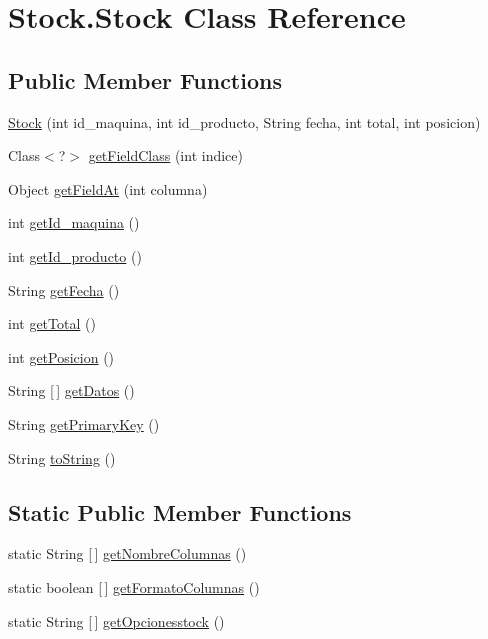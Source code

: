 \hypertarget{class_stock_1_1_stock}{}\section{Stock.\+Stock Class Reference}
\label{class_stock_1_1_stock}
\subsection*{Public Member Functions}
\begin{DoxyCompactItemize}
\item 
\mbox{\hyperlink{class_stock_1_1_stock_a748d53e5ea491907d038c18cb30520c7}{Stock}} (int id\+\_\+maquina, int id\+\_\+producto, String fecha, int total, int posicion)
\item 
Class$<$?$>$ \mbox{\hyperlink{class_stock_1_1_stock_a8e00c1574f810330efb7c84ff971be09}{get\+Field\+Class}} (int indice)
\item 
Object \mbox{\hyperlink{class_stock_1_1_stock_a7fbba145dd4040cc394bb0d903e43787}{get\+Field\+At}} (int columna)
\item 
int \mbox{\hyperlink{class_stock_1_1_stock_acecc43ec5fb13d91e02be7394af1130b}{get\+Id\+\_\+maquina}} ()
\item 
int \mbox{\hyperlink{class_stock_1_1_stock_aa5fac816e624d7e89c4f9f9d081251dc}{get\+Id\+\_\+producto}} ()
\item 
String \mbox{\hyperlink{class_stock_1_1_stock_a4f9b096fbfa184bb56e35fe5b2dd2cac}{get\+Fecha}} ()
\item 
int \mbox{\hyperlink{class_stock_1_1_stock_ad8b5a5604a4421296ab62e8e54817fdd}{get\+Total}} ()
\item 
int \mbox{\hyperlink{class_stock_1_1_stock_aaf8aeb342fb5a0fc05f80a23d03dd5e4}{get\+Posicion}} ()
\item 
String \mbox{[}$\,$\mbox{]} \mbox{\hyperlink{class_stock_1_1_stock_a493235850d940467075d86d233c4c381}{get\+Datos}} ()
\item 
String \mbox{\hyperlink{class_stock_1_1_stock_aaba40908c8c5d06d27e39c3f0c57ba07}{get\+Primary\+Key}} ()
\item 
String \mbox{\hyperlink{class_stock_1_1_stock_a19aa572f66461240db89edf002bec36e}{to\+String}} ()
\end{DoxyCompactItemize}
\subsection*{Static Public Member Functions}
\begin{DoxyCompactItemize}
\item 
static String \mbox{[}$\,$\mbox{]} \mbox{\hyperlink{class_stock_1_1_stock_a5007745c69c26fcf79c85b18497c7b43}{get\+Nombre\+Columnas}} ()
\item 
static boolean \mbox{[}$\,$\mbox{]} \mbox{\hyperlink{class_stock_1_1_stock_a69b313abfef5b90dcdf378ea5a711618}{get\+Formato\+Columnas}} ()
\item 
static String \mbox{[}$\,$\mbox{]} \mbox{\hyperlink{class_stock_1_1_stock_a9418c579ab8866675c103afb3908133e}{get\+Opcionesstock}} ()
\end{DoxyCompactItemize}


